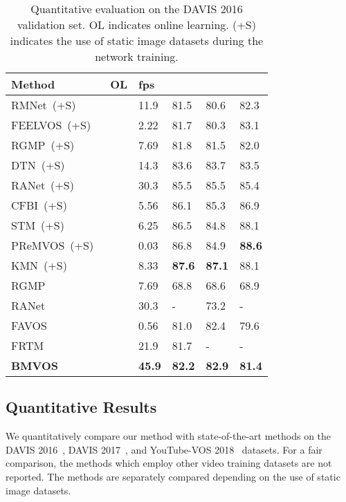 \documentclass[10pt,twocolumn,letterpaper]{article}
\begin{document}
	
	\begin{table}
		\centering 
		\caption{Quantitative evaluation on the DAVIS 2016 validation set. OL indicates online learning. (+S) indicates the use of static image datasets during the network training.}
		\vspace{2mm}
		\small
		\begin{tabular}{lP{0.58cm}P{0.58cm}P{0.58cm}P{0.58cm}P{0.58cm}}
			\toprule
			Method &OL &fps & & &\\
			\midrule
			RMNet~(+S)~\cite{RMNet} & &11.9 &81.5 &80.6 &82.3\\
			FEELVOS~(+S)~\cite{FEELVOS} & &2.22 &81.7 &80.3 &83.1\\
			RGMP~(+S)~\cite{RGMP} & &7.69 &81.8 &81.5 &82.0\\
			DTN~(+S)~\cite{DTN} & &14.3 &83.6 &83.7 &83.5\\
			RANet~(+S)~\cite{RANet} & &30.3 &85.5 &85.5 &85.4\\
			CFBI~(+S)~\cite{CFBI} & &5.56 &86.1 &85.3 &86.9\\
			STM~(+S)~\cite{STM} & &6.25 &86.5 &84.8 &88.1\\
			PReMVOS~(+S)~\cite{PReMVOS} &\checkmark &0.03 &86.8 &84.9 &\textbf{88.6}\\
			KMN~(+S)~\cite{KMN} & &8.33 &\textbf{87.6} &\textbf{87.1} &88.1\\
			\midrule
			RGMP~\cite{RGMP} & &7.69 &68.8 &68.6 &68.9\\
			RANet~\cite{RANet} & &30.3 &- &73.2 &-\\
			FAVOS~\cite{FAVOS} & &0.56 &81.0 &82.4 &79.6\\
			FRTM~\cite{FRTM} &\checkmark &21.9 &81.7 &- &-\\
			\midrule
			\textbf{BMVOS} & &\textbf{45.9} &\textbf{82.2} &\textbf{82.9} &\textbf{81.4}\\
			\bottomrule
		\end{tabular}
		\label{Table:DAVIS16_val}
	\end{table}
	
	
	\subsection{Quantitative Results}
	\label{quantitative}
	We quantitatively compare our method with state-of-the-art methods on the DAVIS 2016~\cite{DAVIS2016}, DAVIS 2017~\cite{DAVIS2017}, and YouTube-VOS 2018~\cite{YTVOS} datasets. For a fair comparison, the methods which employ other video training datasets are not reported. The methods are separately compared depending on the use of static image datasets.
	
\end{document}
